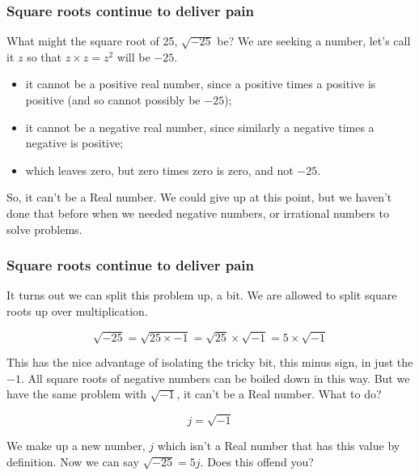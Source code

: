 \documentclass{beamer}
\begin{document}
\begin{frame}
  \frametitle{Square roots continue to deliver pain}
  
What might the square root of 25, $\sqrt{-25}$ be? We are seeking a number, let's call it $z$ so that $z \times z = z^2$ will be $-25$.

\begin{itemize}
\item it cannot be a positive real number, since a positive times a positive is positive (and so cannot possibly be $-25$);
\item it cannot be a negative real number, since similarly a negative times a negative is positive;
\item which leaves zero, but zero times zero is zero, and not $-25$.
\end{itemize}
So, it can't be a Real number. We could give up at this point, but we haven't done that before when we needed negative numbers, or irrational numbers to solve problems.
\end{frame}


\begin{frame}
  \frametitle{Square roots continue to deliver pain}

It turns out we can split this problem up, a bit. We are allowed to split square roots up over multiplication.

\[
\sqrt{-25} = \sqrt{25 \times -1} = \sqrt{25} \times \sqrt{-1} = 5 \times \sqrt{-1}
\]

This has the nice advantage of isolating the tricky bit, this minus sign, in just the $-1$. All square roots of negative numbers can be boiled down in this way. But we have the same problem with $\sqrt{-1}$, it can't be a Real number. What to do?

\[
j = \sqrt{-1}
\]

We make up a new number, $j$ which isn't a Real number that has this value by definition. Now we can say $\sqrt{-25} = 5j$. Does this offend you?
\end{frame}
\end{document}
